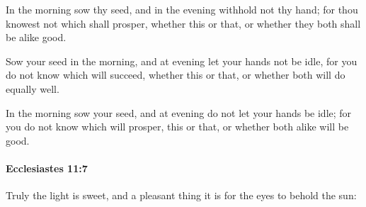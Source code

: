 			\begin{versebox}
					\item[BHS] 
					\item[LXX] 
					\item[ASV] In the morning sow thy seed, and in the evening withhold not thy hand; for thou knowest not which shall prosper, whether this or that, or whether they both shall be alike good.
					\item[NIV] Sow your seed in the morning, and at evening let your hands not be idle, for you do not know which will succeed, whether this or that, or whether both will do equally well.
					\item[NRSV] In the morning sow your seed, and at evening do not let your hands be idle; for you do not know which will prosper, this or that, or whether both alike will be good.
			\end{versebox}

		\paragraph{Ecclesiastes 11:7} %
			\label{ECCLESIASTES-11-7}

			Truly the light is sweet, and a pleasant thing it is for the eyes to behold the sun:

